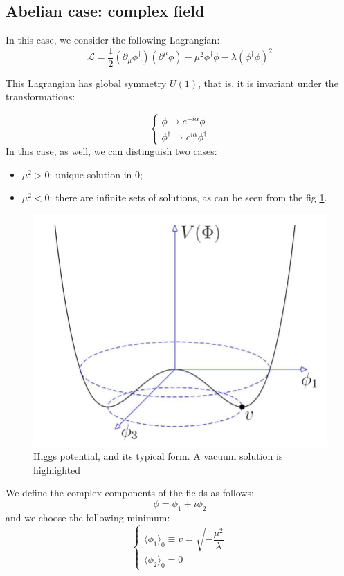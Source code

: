 \subsection{Abelian case: complex field}
In this case, we consider the following Lagrangian:
\begin{equation}
    \mathcal{L} = \frac{1}{2} (\partial_{\mu}\phi^\dagger)(\partial^{\mu}\phi) - \mu^2\phi^\dagger\phi - \lambda (\phi^\dagger\phi)^2
\end{equation}

This Lagrangian has global symmetry $U(1)$, that is, it is invariant under the transformations:
    

\begin{equation}
\begin{cases}
    \phi \rightarrow e^{-i \alpha}\phi \\
    \phi^{\dagger} \rightarrow e^{i \alpha} \phi^{\dagger}
\end{cases}
\end{equation}
In this case, as well, we can distinguish two cases:
\begin{itemize}
    \item $\mu^2> 0$: unique solution in 0;
    \item $\mu^2<0$: there are infinite sets of solutions, as can be seen from the fig \ref{higgs}.
\end{itemize}
\begin{figure}
    \centering
    \includegraphics[width=\textwidth]{images/higgs_potential.jpg}
    \caption{Higgs potential, and its typical form. A vacuum solution is highlighted}
    \label{higgs}
\end{figure}
We define the complex components of the fields as follows:
\begin{equation}
    \phi = \phi_1 + i \phi_2
\end{equation}
and we choose the following minimum:
\begin{equation}
    \begin{cases}
        \langle\phi_1\rangle_0 \equiv v = \sqrt{-\dfrac{\mu^2}{\lambda}} \\
        \langle \phi_2\rangle_0 = 0
    \end{cases}
\end{equation}


